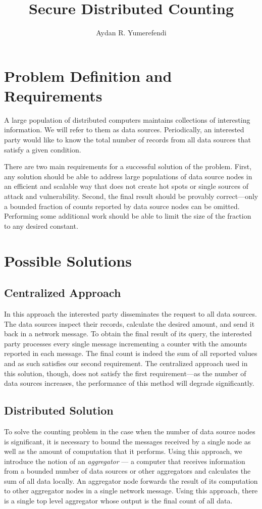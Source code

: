 \documentclass{article}
\title{Secure Distributed Counting}
\author{Aydan R. Yumerefendi}
\begin{document}
\maketitle

\section{Problem Definition and Requirements} 
A large population of distributed computers maintains collections of interesting
information. We will refer to them as data sources. Periodically, an
interested party would like to know the total number of records
from all data sources that satisfy a given condition. 

There are two main requirements for a successful solution of the
problem. First, any solution should be able to address large
populations of data source nodes in an efficient and scalable way that
does not create hot spots or single sources of attack and
vulnerability. Second, the final result should be
provably correct---only a bounded fraction of counts reported by data
source nodes can be omitted. Performing some additional work should be
able to limit the size of the fraction to any desired constant.

\section{Possible Solutions}

\subsection{Centralized Approach}
In this approach the interested party disseminates the request to all
data sources. The data sources inspect their records, calculate the
desired amount, and send it back in a network message. To obtain the
final result of its query, the interested party processes every single
message incrementing a counter with the amounts reported in each
message. The final count is indeed the sum of all reported values and
as such satisfies our second requirement. The centralized approach
used in this solution, though, does not satisfy the first
requirement---as the number of data sources increases, the
performance of this method will degrade significantly.

\subsection{Distributed Solution}
To solve the counting problem in the case when the number of data
source nodes is significant, it is necessary to bound the messages
received by a single node as well as the amount of computation that it
performs. Using this approach, we introduce the notion of an
\emph{aggregator} --- a computer that receives information from a
bounded number of data sources or other aggregators and calculates the
sum of all data locally. An aggregator node forwards the result of
its computation to other aggregator nodes in a single network
message. Using this approach, there is a single top level aggregator
whose output is the final count of all data.
\end{document}
